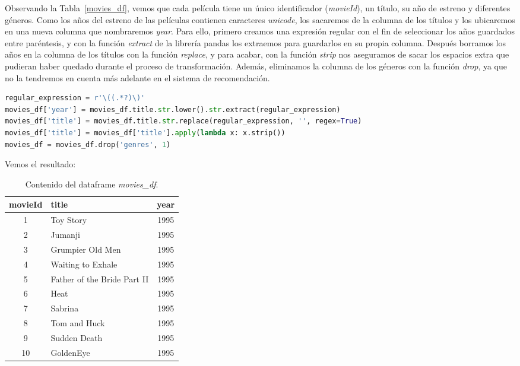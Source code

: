 \documentclass{uimppracticas}
\begin{document}
Observando la Tabla~\ref{movies_df}, vemos que cada película tiene un único identificador (\textit{movieId}), un título, su año de estreno y diferentes géneros. Como los años del estreno de las películas contienen caracteres \textit{unicode}, los sacaremos de la columna de los títulos y los ubicaremos en una nueva columna que nombraremos \textit{year}. Para ello, primero creamos una expresión regular con el fin de seleccionar los años guardados entre paréntesis, y con la función \textit{extract} de la librería pandas los extraemos para guardarlos en su propia columna. Después borramos los años en la columna de los títulos con la función \textit{replace}, y para acabar, con la función \textit{strip} nos aseguramos de sacar los espacios extra que pudieran haber quedado durante el proceso de transformación. Además, eliminamos la columna de los géneros con la función \textit{drop}, ya que no la tendremos en cuenta más adelante en el sistema de recomendación.

\newpage

\begin{lstlisting}[language=python, basicstyle=\small]
regular_expression = r'\((.*?)\)'
movies_df['year'] = movies_df.title.str.lower().str.extract(regular_expression)
movies_df['title'] = movies_df.title.str.replace(regular_expression, '', regex=True)
movies_df['title'] = movies_df['title'].apply(lambda x: x.strip())
movies_df = movies_df.drop('genres', 1)
\end{lstlisting}

Vemos el resultado:

\begin{table}[H]
	\centering
	\begin{tabular}{clc}
		\toprule
		movieId &                  title &  year \\
		\midrule
		1 &                    Toy Story &  1995 \\
		2 &                      Jumanji &  1995 \\
		3 &             Grumpier Old Men &  1995 \\
		4 &            Waiting to Exhale &  1995 \\
		5 &  Father of the Bride Part II &  1995 \\
		6 &                         Heat &  1995 \\
		7 &                      Sabrina &  1995 \\
		8 &                 Tom and Huck &  1995 \\
		9 &                 Sudden Death &  1995 \\
		10 &                    GoldenEye &  1995 \\
		\bottomrule
	\end{tabular}
	\caption{Contenido del dataframe \textit{movies\_df}.}
	\label{movies_df_final}
\end{table}
\end{document}
